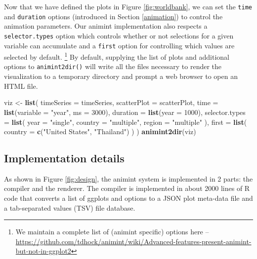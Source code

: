\documentclass[12pt,]{article}
\newenvironment{Shaded}{\begin{snugshade}}{\end{snugshade}}
\newcommand{\KeywordTok}[1]{\textcolor[rgb]{0.13,0.29,0.53}{\textbf{#1}}}
\newcommand{\DataTypeTok}[1]{\textcolor[rgb]{0.13,0.29,0.53}{#1}}
\newcommand{\DecValTok}[1]{\textcolor[rgb]{0.00,0.00,0.81}{#1}}
\newcommand{\StringTok}[1]{\textcolor[rgb]{0.31,0.60,0.02}{#1}}
\newcommand{\NormalTok}[1]{#1}
\let\rmarkdownfootnote\footnote%
\def\footnote{\protect\rmarkdownfootnote}
\theoremstyle{definition}
\theoremstyle{definition}
\theoremstyle{remark}
\begin{document}
Now that we have defined the plots in Figure \ref{fig:worldbank}, we can
set the \texttt{time} and \texttt{duration} options (introduced in
Section \ref{animation}) to control the animation parameters. Our
animint implementation also respects a \texttt{selector.types} option
which controls whether or not selections for a given variable can
accumulate and a \texttt{first} option for controlling which values are
selected by default.
\footnote{We maintain a complete list of (animint specific) options here --
\url{https://github.com/tdhock/animint/wiki/Advanced-features-present-animint-but-not-in-ggplot2}}
By default, supplying the list of plots and additional options to
\texttt{animint2dir()} will write all the files necessary to render the
visualization to a temporary directory and prompt a web browser to open
an HTML file.

\begin{Shaded}
\begin{Highlighting}[]
\NormalTok{viz <-}\StringTok{ }\KeywordTok{list}\NormalTok{(}
  \DataTypeTok{timeSeries =}\NormalTok{ timeSeries,}
  \DataTypeTok{scatterPlot =}\NormalTok{ scatterPlot,}
  \DataTypeTok{time =} \KeywordTok{list}\NormalTok{(}\DataTypeTok{variable =} \StringTok{"year"}\NormalTok{, }\DataTypeTok{ms =} \DecValTok{3000}\NormalTok{),}
  \DataTypeTok{duration =} \KeywordTok{list}\NormalTok{(}\DataTypeTok{year =} \DecValTok{1000}\NormalTok{),}
  \DataTypeTok{selector.types =} \KeywordTok{list}\NormalTok{(}
    \DataTypeTok{year =} \StringTok{"single"}\NormalTok{,}
    \DataTypeTok{country =} \StringTok{"multiple"}\NormalTok{,}
    \DataTypeTok{region =} \StringTok{"multiple"}
\NormalTok{  ),}
  \DataTypeTok{first =} \KeywordTok{list}\NormalTok{(}
    \DataTypeTok{country =} \KeywordTok{c}\NormalTok{(}\StringTok{"United States"}\NormalTok{, }\StringTok{"Thailand"}\NormalTok{)}
\NormalTok{  )}
\NormalTok{)}
\KeywordTok{animint2dir}\NormalTok{(viz)}
\end{Highlighting}
\end{Shaded}

\subsection{Implementation details}\label{implementation}

As shown in Figure \ref{fig:design}, the animint system is implemented
in 2 parts: the compiler and the renderer. The compiler is implemented
in about 2000 lines of R code that converts a list of ggplots and
options to a JSON plot meta-data file and a tab-separated values (TSV)
file database.
\end{document}
